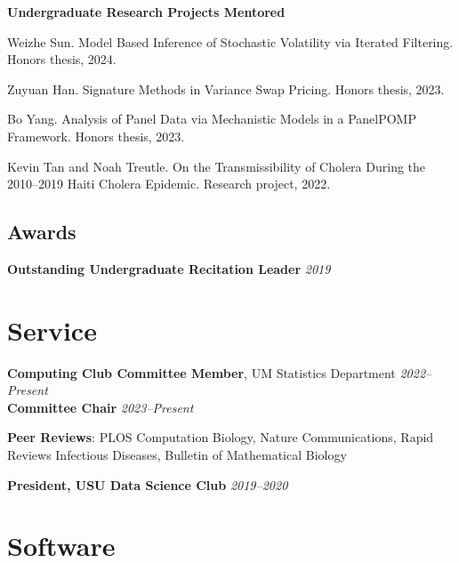 \documentclass[11pt]{article}
\newenvironment {reflist}
                {
                 \begin{list}{}
                 {\setlength{\labelwidth}{0mm}
                  \setlength{\leftmargin}{8mm}
                  \setlength{\itemindent}{-3mm}
                  \setlength{\labelsep}{0mm}
                  \setlength{\parsep}{0.1 ex}
                  \setlength{\itemsep}{0.1cm}
      \setlength{\topsep}{0.15cm}}} %
   {\end{list}}
\begin{document}
\noindent \textbf{Undergraduate Research Projects Mentored}

\begin{reflist}

  \item Weizhe Sun. Model Based Inference of Stochastic Volatility via Iterated Filtering. Honors thesis, 2024.
  \item Zuyuan Han. Signature Methods in Variance Swap Pricing. Honors thesis, 2023.
  \item Bo Yang. Analysis of Panel Data via Mechanistic Models in a PanelPOMP Framework. Honors thesis, 2023.
  \item Kevin Tan and Noah Treutle. On the Transmissibility of Cholera During the 2010--2019 Haiti Cholera Epidemic. Research project, 2022.

\end{reflist}

\subsection*{Awards}

\hspace{5mm}\textbf{Outstanding Undergraduate Recitation Leader} \hfill  {\textit{2019}}

\noindent\hspace{5mm}{\it USU Mathematics and Statistics Department}

\section*{Service}

\noindent \textbf{Computing Club Committee Member}, UM Statistics Department \hfill  {\textit{2022--Present}}\\
\noindent \textbf{Committee Chair} \hfill {\it 2023--Present}

\vspace{2mm}
\noindent \textbf{Peer Reviews}: PLOS Computation Biology, Nature Communications, Rapid Reviews Infectious Diseases, Bulletin of Mathematical Biology

\vspace{2mm}
\noindent \textbf{President, USU Data Science Club} \hfill  {\textit{2019--2020}}

\section*{Software}
\end{document}
